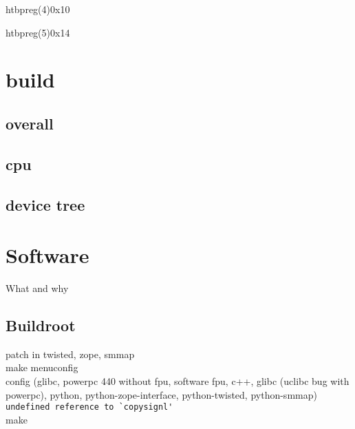 \documentclass[11pt,technote,a4paper,twocolumn]{IEEEtran}
\begin{document}
\begin{register}{htbp}{reg(4)}{0x10}%
    \label{reg4}%
    \regnewline%
\end{register}
\begin{register}{htbp}{reg(5)}{0x14}%
    \label{reg5}%
    \regnewline%
\end{register}
\section{build}
\subsection{overall}
\subsection{cpu}
\subsection{device tree}
\section{Software}
What and why
\subsection{Buildroot}
patch in twisted, zope, smmap\\
make menuconfig\\
config (glibc, powerpc 440 without fpu, software fpu, c++, glibc (uclibc bug with powerpc), python, python-zope-interface, python-twisted, python-smmap)\\
\verb+undefined reference to `copysignl'+\\
make
\end{document}
